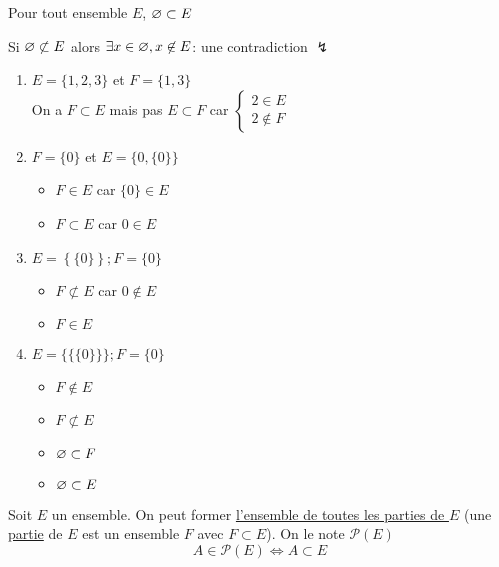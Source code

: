 \begin{prop}
	Pour tout ensemble $E$, $\varnothing \subset E$
\end{prop}

\begin{prv}
	Si $\varnothing \not\subset E$ alors $\exists x \in \varnothing, x \not\in E$: une contradiction $\lightning$ \\
\end{prv}

\begin{exm}
	\begin{enumerate}
		\item $E = \{1,2,3\}$ et $F = \{1,3\}$ \\
			On a $F \subset E$ mais pas $E \subset F$ car $\begin{cases}
				2 \in E\\
				2\not\in F
			\end{cases}$ 
		\item $F = \{0\}$ et $E = \{0, \{0\} \}$ \\
			\begin{itemize}
				\item  $F \in E$ car $\{0\} \in E$ 
				\item $F \subset  E$ car $0 \in E$
			\end{itemize}
		\item $E = \left\{ \{0\}  \right\}; F = \{0\}$ 
			\begin{itemize}
				\item $F \not\subset E$ car $0 \not\in E$
				\item $F \in E$
			\end{itemize}
		\item $E = \{\{\{0\} \} \}; F = \{0\}$ 
			\begin{itemize}
				\item $F\not\in E$
				\item $F\not\subset E$ 
				\item $\varnothing \subset F$ 
				\item $\varnothing\subset E$
			\end{itemize}
	\end{enumerate}
\end{exm}

\begin{defn}
	Soit $E$ un ensemble. On peut former \underline{l'ensemble de toutes les parties de $E$}
	(une \underline{partie} de $E$ est un ensemble $F$ avec $F\subset E$). On le note $\mathcal{P}(E)$\\
	\[
		A \in \mathcal{P}(E) \iff A \subset E
	\]

\end{defn}

